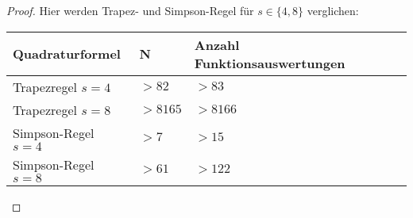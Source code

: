 \begin{proof}
  Hier werden Trapez- und Simpson-Regel für $s \in \{4,8\}$ verglichen:
  \begin{center}
    \begin{tabular}{|l|l|l|l|}
      \hline
      Quadraturformel & N & Anzahl Funktionsauswertungen \\
      \hline
      Trapezregel $s=4$ & $>82$ & $>83$ \\
      \hline
      Trapezregel $s=8$ & $>8165$ & $>8166$ \\
      \hline
      Simpson-Regel $s=4$ & $>7$ & $>15$ \\
      \hline
      Simpson-Regel $s=8$ & $>61$ & $>122$ \\
      \hline
    \end{tabular}
  \end{center}

\end{proof}
